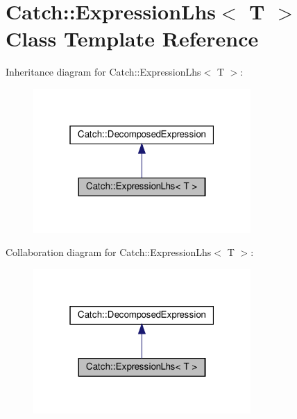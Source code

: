 \hypertarget{classCatch_1_1ExpressionLhs}{}\section{Catch\+:\+:Expression\+Lhs$<$ T $>$ Class Template Reference}
\label{classCatch_1_1ExpressionLhs}


Inheritance diagram for Catch\+:\+:Expression\+Lhs$<$ T $>$\+:\nopagebreak
\begin{figure}[H]
\begin{center}
\leavevmode
\includegraphics[width=235pt]{classCatch_1_1ExpressionLhs__inherit__graph}
\end{center}
\end{figure}


Collaboration diagram for Catch\+:\+:Expression\+Lhs$<$ T $>$\+:\nopagebreak
\begin{figure}[H]
\begin{center}
\leavevmode
\includegraphics[width=235pt]{classCatch_1_1ExpressionLhs__coll__graph}
\end{center}
\end{figure}
